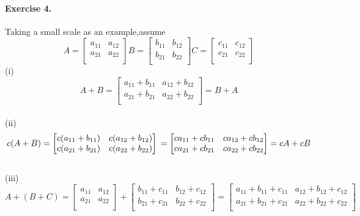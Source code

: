\documentclass{article}
\begin{document}
\paragraph{Exercise 4.}Taking a small scale as an example,assume
\[
A=\begin{bmatrix}
a_{11} & a_{12}\\
a_{21} & a_{22}\\
\end{bmatrix}
 B=\begin{bmatrix}
b_{11} & b_{12}\\
b_{21} & b_{22}\\
\end{bmatrix}
 C=\begin{bmatrix}
c_{11} & c_{12}\\
c_{21} & c_{22}\\
\end{bmatrix}
\]
(i)\[A+B=
\begin{bmatrix}
a_{11}+b_{11} & a_{12}+b_{12}\\
a_{21}+b_{21} & a_{22}+b_{22}\\
\end{bmatrix}
= B+A\] \\
(ii)\[c(A+B)=
\begin{bmatrix}
c(a_{11}+b_{11}) & c (a_{12}+b_{12})\\
c(a_{21}+b_{21}) & c(a_{22}+b_{22})\\
\end{bmatrix}\\=
\begin{bmatrix}
ca_{11}+cb_{11} & ca_{12}+cb_{12}\\
ca_{21}+cb_{21} & ca_{22}+cb_{22}\\
\end{bmatrix}
=cA+cB\] \\
(iii)\[
A+(B+C)=
\begin{bmatrix}
a_{11} & a_{12}\\
a_{21} & a_{22}\\
\end{bmatrix}
+
\begin{bmatrix}
b_{11}+c_{11} & b_{12}+c_{12}\\
b_{21}+c_{21} & b_{22}+c_{22}\\
\end{bmatrix}
=
\begin{bmatrix}
a_{11}+b_{11}+c_{11} & a_{12}+b_{12}+c_{12}\\
a_{21}+b_{21}+c_{21} & a_{22}+b_{22}+c_{22}\\
\end{bmatrix} 
\]\\
\end{document}
